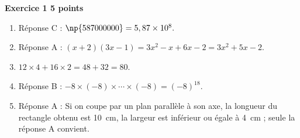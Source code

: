 \textbf{Exercice 1 \hfill 5 points}

\medskip

%
\begin{enumerate}
\item Réponse C : $\np{587000000} = 5,87 \times 10^8.$
\item Réponse A : $(x + 2)(3x - 1) = 3x^2 - x + 6x - 2 = 3x^2 + 5x - 2$.
\item $12 \times 4 + 16 \times 2 = 48 + 32 = 80$.
\item Réponse B : $- 8 \times (- 8) \times \cdots \times(- 8) =  (- 8)^{18}$.
\item Réponse A : Si on coupe par un plan parallèle à son axe, la longueur du
rectangle obtenu est 10~cm, la largeur est inférieur ou égale à 4~cm ; seule la réponse A
convient.
\end{enumerate}

\vspace{0,5cm}

